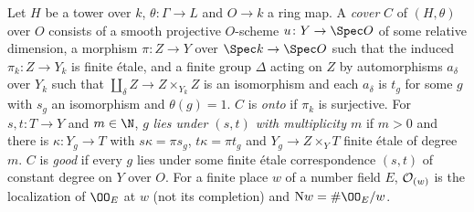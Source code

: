 \begin{definition}[Covers]\label{pf:steps1:def:cover}
Let $H$ be a tower over $k$, $\theta\colon\Gamma\to L$ and $O\to k$ a ring map. A \emph{cover} $C$ of
$(H,\theta)$ over $O$ consists of a smooth projective $O$-scheme $u\colon Y\to\Spec O$ of some relative
dimension, a morphism $\pi\colon Z\to Y$ over $\Spec k\to\Spec O$ such that the induced
$\pi_k\colon Z\to Y_k$ is finite \'etale, and a finite group $\Delta$ acting on $Z$ by automorphisms
$a_\delta$ over $Y_k$ such that $\coprod_{\delta}Z\to Z\times_{Y_k}Z$ is an isomorphism and each $a_\delta$ is
$t_g$ for some $g$ with $s_g$ an isomorphism and $\theta(g)=1$. $C$ is \emph{onto} if $\pi_k$ is
surjective. For $s,t\colon T\to Y$ and $m\in\N$, $g$ \emph{lies under $(s,t)$ with multiplicity $m$} if
$m>0$ and there is $\kappa\colon Y_g\to T$ with $s\kappa=\pi s_g$, $t\kappa=\pi t_g$ and
$Y_g\to Z\times_YT$ finite \'etale of degree $m$. $C$ is \emph{good} if every $g$ lies under some finite
\'etale correspondence $(s,t)$ of constant degree on $Y$ over $O$. For a finite place $w$ of a number field
$E$, $\mathcal{O}_{(w)}$ is the localization of $\OO_E$ at $w$ (not its completion) and $\stepsINw=\#\OO_E/w$.
 
 
\end{definition}

